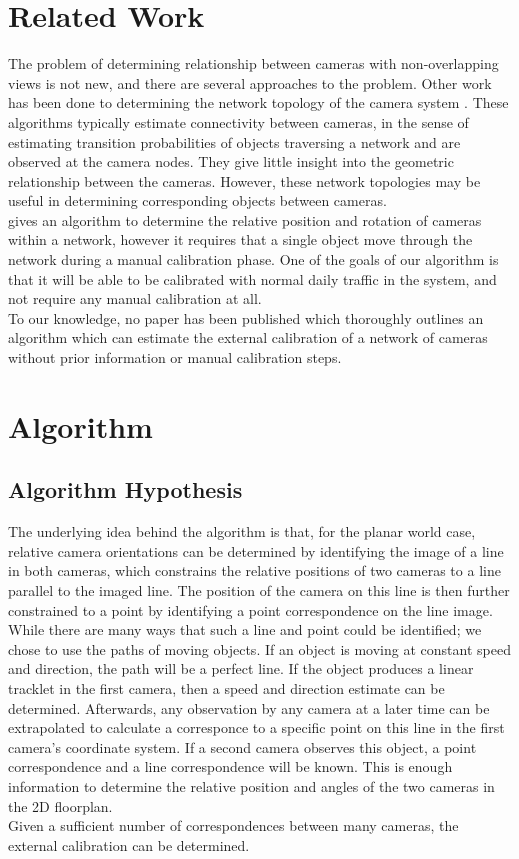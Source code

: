 \documentclass[journal]{IEEEtran}
\begin{document}
\section{Related Work}
	\indent The problem of determining relationship between cameras with non-overlapping views is not new, and there are several approaches to the problem. Other work has been done to determining the network topology of the camera system \cite{ellis2003,makris2004}. These algorithms typically estimate connectivity between cameras, in the sense of estimating transition probabilities of objects traversing a network and are observed at the camera nodes. They give little insight into the geometric relationship between the cameras. However, these network topologies may be useful in determining corresponding objects between cameras. \\
	\indent \cite{rahimi2004} gives an algorithm to determine the relative position and rotation of cameras within a network, however it requires that a single object move through the network during a manual calibration phase. One of the goals of our algorithm is that it will be able to be calibrated with normal daily traffic in the system, and not require any manual calibration at all. \\
	\indent To our knowledge, no paper has been published which thoroughly outlines an algorithm which can estimate the external calibration of a network of cameras without prior information or manual calibration steps.
	
\section{Algorithm}
	\subsection{Algorithm Hypothesis}
		\indent The underlying idea behind the algorithm is that, for the planar world case, relative camera orientations can be determined by identifying the image of a line in both cameras, which constrains the relative positions of two cameras to a line parallel to the imaged line. The position of the camera on this line is then further constrained to a point by identifying a point correspondence on the line image. \\
		\indent While there are many ways that such a line and point could be identified; we chose to use the paths of moving objects. If an object is moving at constant speed and direction, the path will be a perfect line. If the object produces a linear tracklet in the first camera, then a speed and direction estimate can be determined. Afterwards, any observation by any camera at a later time can be extrapolated to calculate a corresponce to a specific point on this line in the first camera’s coordinate system. If a second camera observes this object, a point correspondence and a line correspondence will be known. This is enough information to determine the relative position and angles of the two cameras in the 2D floorplan. \\
		\indent Given a sufficient number of correspondences between many cameras, the external calibration can be determined.
		
\end{document}
